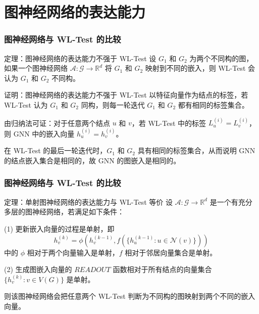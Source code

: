 \documentclass{beamer}
\begin{document}
\section{图神经网络的表达能力}

\begin{frame}

  \frametitle{图神经网络与 WL-Test 的比较}
  \begin{alertblock}{定理：图神经网络的表达能力不强于 WL-Test}
    设 $G_1$ 和 $G_2$ 为两个不同构的图，如果一个图神经网络 $\mathcal{A}: \mathcal{G} \rightarrow \mathbb{R}^d$
    将 $G_1$ 和 $G_2$ 映射到不同的嵌入，则 WL-Test 会认为 $G_1$ 和 $G_2$ 不同构。
  \end{alertblock}
  \begin{block}{证明：图神经网络的表达能力不强于 WL-Test}
    以特征向量作为结点的标签，若 WL-Test 认为 $G_1$ 和 $G_2$ 同构，则每一轮迭代 $G_1$ 和 $G_2$ 都有相同的标签集合。
    
    由归纳法可证：对于任意两个结点 $u$ 和 $v$，若 WL-Test 中的标签 $L_u^{(i)} = L_v^{(i)}$，则 GNN 中的嵌入向量
    $h_u^{(i)} = h_v^{(i)}$。

    在 WL-Test 的最后一轮迭代时，$G_1$ 和 $G_2$ 具有相同的标签集合，从而说明 GNN 的结点嵌入集合是相同的，故
    GNN 的图嵌入是相同的。
  \end{block}

\end{frame}

\begin{frame}

  \frametitle{图神经网络与 WL-Test 的比较}
  \begin{alertblock}{定理：单射图神经网络的表达能力与 WL-Test 等价}
    设 $\mathcal{A}: \mathcal{G} \rightarrow \mathbb{R}^d$ 是一个有充分多层的图神经网络，若满足如下条件：

    (1) 更新嵌入向量的过程是单射，即
    $$ h_v^{(k)} = \phi(h_v^{(k-1)}, f(\{h_u^{(k-1)} : u \in \mathcal{N}(v)\})) $$
    中的 $\phi$ 相对于两个向量输入是单射，$f$ 相对于邻居向量集合是单射。

    (2) 生成图嵌入向量的 $READOUT$ 函数相对于所有结点的向量集合 $\{h_v^{(k)} : v \in V(G)\}$ 是单射。

    则该图神经网络会把任意两个 WL-Test 判断为不同构的图映射到两个不同的嵌入向量。

  \end{alertblock}

\end{frame}
\end{document}
